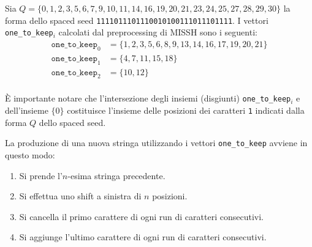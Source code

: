 \begin{example}
	Sia $Q = \{0, 1, 2, 3, 5, 6, 7, 9, 10, 11, 14, 16, 19, 20, 21, 23, 24, 25, 27, 28, 29, 30 \}$ la forma dello spaced seed \texttt{1111011101110010100111011101111}. I vettori \verb|one_to_keep|$_i$ calcolati dal preprocessing di MISSH sono i seguenti: \begin{align*}
		\texttt{one\_to\_keep}_0 &= \{ 1, 2, 3, 5, 6, 8, 9, 13, 14, 16, 17, 19, 20, 21 \} \\
		\texttt{one\_to\_keep}_1 &= \{ 4, 7, 11, 15, 18 \} \\
		\texttt{one\_to\_keep}_2 &= \{ 10, 12 \} \\
	\end{align*}
	
	È importante notare che l'intersezione degli insiemi (disgiunti) \verb|one_to_keep|$_i$ e dell'insieme $\{ 0 \}$ costituisce l'insieme delle posizioni dei caratteri \texttt{1} indicati dalla forma $Q$ dello spaced seed.
\end{example}

La produzione di una nuova stringa utilizzando i vettori \verb|one_to_keep| avviene in questo modo:
\begin{enumerate}
	\item Si prende l'$n$-esima stringa precedente.
	\item Si effettua uno shift a sinistra di $n$ posizioni.
	\item Si cancella il primo carattere di ogni run di caratteri consecutivi.
	\item Si aggiunge l’ultimo carattere di ogni run di caratteri consecutivi.
\end{enumerate}

